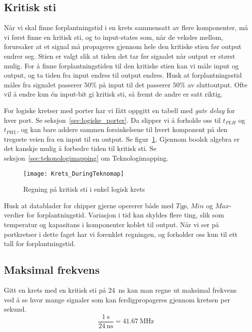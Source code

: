 \documentclass[12pt,a4paper,norsk]{article}
\begin{document}
\subsection{Kritisk sti}\label{sec:kritisk_sti}
Når vi skal finne forplantningstid i en krets sammensatt av flere komponenter,
må vi først finne en kritisk sti, og to input-states som, når de veksles mellom,
forursaker at et signal må propageres gjennom hele den kritiske stien før output
endrer seg. Stien er valgt slik at tiden det tar før signalet når output er størst
mulig. For å finne forplantningstiden til den kritiske stien kan vi måle input og
output, og ta tiden fra input endres til output endres. Husk at
forplantningsstid måles fra signalet passerer $50\%$ på input til det passerer
$50\%$ av sluttoutput. Ofte vil å endre kun én input-bit gi kritisk sti, så
fremt de andre er satt riktig.

For logiske kretser med porter har vi fått oppgitt en tabell med \textit{gate
 delay} for hver port. Se seksjon~\ref{sec:logiske_porter}. Da slipper vi å
forholde oss til $t_{PLH}$ og $t_{PHL}$, og kan bare addere sammen
forsinkelsene til hvert komponent på den tregeste veien fra en input til en
output. Se figur~\ref{fig:kritisk_sti}. Gjennom boolsk algebra er det kanskje
mulig å forbedre tiden til kritisk sti. Se seksjon~\ref{sec:tekonologimapping}
om Teknologimapping.

\begin{figure}[hbt!]
  \centering
  \texttt{[image: Krets\_DuringTeknomap]}
  \caption{Regning på kritisk sti i enkel logisk krets\label{fig:kritisk_sti}}
\end{figure}

Husk at datablader for chipper gjerne opererer både med $Typ$, $Min$ og
$Max$-verdier for forplantningstid. Variasjon i tid kan skyldes flere ting, slik
som temperatur og kapasitans i komponenter koblet til output. Når vi ser på
portkretser i dette faget har vi forenklet regningen, og forholder oss kun til
ett tall for forplantningstid.

\subsection{Maksimal frekvens}
Gitt en krets med en kritisk sti på \SI{24}{\nano\second} kan man regne ut
maksimal frekvens ved å se hvor mange signaler som kan ferdigpropageres gjennom
kretsen per sekund.
\[\frac{\SI{1}{\second}}{\SI{24}{\nano\second}} = \SI{41,67}{\mega\hertz}\]
\end{document}
